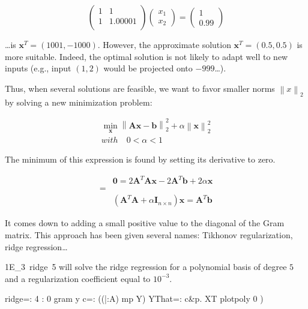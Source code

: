 \documentclass[10pt]{article}%
\renewcommand{\vec}[1]{\boldsymbol{#1}}
\newcommand{\norm}[1]{\left\lVert#1\right\rVert}
\begin{document}
\[
\left( \begin{array}{cc}
1 & 1 \\
1 & 1.00001 \\
\end{array} \right)
\left( \begin{array}{c}
x_1 \\ x_2
\end{array} \right)
=
\left( \begin{array}{c}
1 \\ 0.99 
\end{array} \right)
\]

\dots is $\vec{x}^T = (1001,-1000)$. However, the approximate solution
$\vec{x}^T = (0.5,0.5)$ is  more suitable. Indeed, the optimal solution is not
likely to adapt well to new inputs (e.g., input $(1,2)$ would be projected onto
$-999$\dots).

Thus, when several solutions are feasible, we want to favor smaller
norms $\norm{x}_2$ by solving a new minimization problem:

\begin{align*}
\min_{\vec{x}} \norm{\vec{A}\vec{x}-\vec{b}}^2_2 + \alpha \norm{\vec{x}}^2_2 \\
with \quad 0 < \alpha < 1
\end{align*}

The minimum of this expression is found by setting its derivative to zero.

\begin{align*}
 & \vec{0} = 2\vec{A}^T\vec{A}\vec{x} - 2\vec{A}^T\vec{b} + 2\alpha\vec{x} \\
=& \\
 & \left( \vec{A}^T\vec{A} + \alpha \vec{I}_{n\times n} \right) \vec{x} = \vec{A}^T \vec{b}
\end{align*}

It comes down to adding a small positive value to the diagonal of the
Gram matrix. This approach has been given several names: Tikhonov regularization,
ridge regression\dots

{\Tt{}1E{\_}3\ ridge\ 5\nwendquote} will solve the ridge regression for a polynomial basis of
degree $5$ and a regularization coefficient equal to $10^{-3}$.

\nwenddocs{}\endmoddef\nwstartdeflinemarkup{}\nwenddeflinemarkup
ridge=: 4 : 0
  gram y
  c=: ((|:A) mp Y) %
  YThat=: c&p. XT
  plotpoly 0
)
\end{document}
